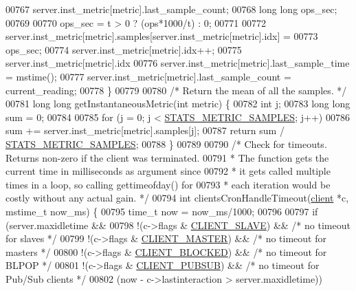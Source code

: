 \begin{DoxyCode}
{{{{{00767                     server.inst\_metric[metric].last\_sample\_count;
00768     \textcolor{keywordtype}{long} \textcolor{keywordtype}{long} ops\_sec;
00769 
00770     ops\_sec = t > 0 ? (ops*1000/t) : 0;
00771 
00772     server.inst\_metric[metric].samples[server.inst\_metric[metric].idx] =
00773         ops\_sec;
00774     server.inst\_metric[metric].idx++;
00775     server.inst\_metric[metric].idx %
00776     server.inst\_metric[metric].last\_sample\_time = mstime();
00777     server.inst\_metric[metric].last\_sample\_count = current\_reading;
00778 \}
00779 
00780 \textcolor{comment}{/* Return the mean of all the samples. */}
00781 \textcolor{keywordtype}{long} \textcolor{keywordtype}{long} getInstantaneousMetric(\textcolor{keywordtype}{int} metric) \{
00782     \textcolor{keywordtype}{int} j;
00783     \textcolor{keywordtype}{long} \textcolor{keywordtype}{long} sum = 0;
00784 
00785     \textcolor{keywordflow}{for} (j = 0; j < \hyperlink{server_8h_a225a9e35f2cb8aa663571625bc59a533}{STATS\_METRIC\_SAMPLES}; j++)
00786         sum += server.inst\_metric[metric].samples[j];
00787     \textcolor{keywordflow}{return} sum / \hyperlink{server_8h_a225a9e35f2cb8aa663571625bc59a533}{STATS\_METRIC\_SAMPLES};
00788 \}
00789 
00790 \textcolor{comment}{/* Check for timeouts. Returns non-zero if the client was terminated.}
00791 \textcolor{comment}{ * The function gets the current time in milliseconds as argument since}
00792 \textcolor{comment}{ * it gets called multiple times in a loop, so calling gettimeofday() for}
00793 \textcolor{comment}{ * each iteration would be costly without any actual gain. */}
00794 \textcolor{keywordtype}{int} clientsCronHandleTimeout(\hyperlink{structclient}{client} *c, mstime\_t now\_ms) \{
00795     time\_t now = now\_ms/1000;
00796 
00797     \textcolor{keywordflow}{if} (server.maxidletime &&
00798         !(c->flags & \hyperlink{server_8h_ae9f6995948253652bc9454d79a72f4a7}{CLIENT\_SLAVE}) &&    \textcolor{comment}{/* no timeout for slaves */}
00799         !(c->flags & \hyperlink{server_8h_a3d8f0cc8d0653ee2b6dafb454292c069}{CLIENT\_MASTER}) &&   \textcolor{comment}{/* no timeout for masters */}
00800         !(c->flags & \hyperlink{server_8h_a503ad979164a52f0f5e2a63e4c7da3a0}{CLIENT\_BLOCKED}) &&  \textcolor{comment}{/* no timeout for BLPOP */}
00801         !(c->flags & \hyperlink{server_8h_a20f2f5380db97cd09013118ffc9411cc}{CLIENT\_PUBSUB}) &&   \textcolor{comment}{/* no timeout for Pub/Sub clients */}
00802         (now - c->lastinteraction > server.maxidletime))
}}}}}
\end{DoxyCode}
